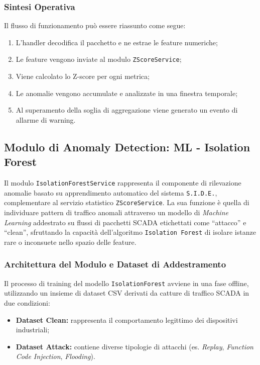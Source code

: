 \begin{enumerate}
\subsubsection*{Sintesi Operativa}
Il flusso di funzionamento può essere riassunto come segue:
\begin{enumerate}
  \item L’handler decodifica il pacchetto e ne estrae le feature numeriche;
  \item Le feature vengono inviate al modulo \texttt{ZScoreService};
  \item Viene calcolato lo Z-score per ogni metrica;
  \item Le anomalie vengono accumulate e analizzate in una finestra temporale;
  \item Al superamento della soglia di aggregazione viene generato un evento di allarme di warning.
\end{enumerate}



\subsection{Modulo di Anomaly Detection: ML - Isolation Forest}
\label{subsec:ml-isoforest}

Il modulo \texttt{IsolationForestService} rappresenta il componente di rilevazione anomalie basato su apprendimento automatico del sistema \texttt{S.I.D.E.}, complementare al servizio statistico \texttt{ZScoreService}.
La sua funzione è quella di individuare pattern di traffico anomali attraverso un modello di \textit{Machine Learning} addestrato su flussi di pacchetti SCADA etichettati come “attacco” e “clean”, sfruttando la capacità dell’algoritmo \texttt{Isolation Forest} di isolare istanze rare o inconsuete nello spazio delle feature.

\subsubsection{Architettura del Modulo e Dataset di Addestramento}
Il processo di training del modello \texttt{IsolationForest} avviene in una fase offline, utilizzando un insieme di dataset CSV derivati da catture di traffico SCADA in due condizioni:
\begin{itemize}
\item \textbf{Dataset Clean:} rappresenta il comportamento legittimo dei dispositivi industriali;
\item \textbf{Dataset Attack:} contiene diverse tipologie di attacchi (es. \textit{Replay}, \textit{Function Code Injection}, \textit{Flooding}).
\end{itemize}


\end{enumerate}
